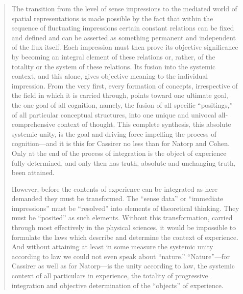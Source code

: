 \documentclass{article}
\begin{document}
\begin{quote}
    The transition from the level of sense impressions to the mediated world of spatial representations is made possible by the fact that within the sequence of fluctuating impressions certain constant relations can be fixed and defined and can be asserted as something permanent and independent of the flux itself.  Each impression must then prove its objective significance by becoming an integral element of these relations or, rather, of the totality or the system of these relations.  Its fusion into the systemic context, and this alone, gives objective meaning to the individual impression.  From the very first, every formation of concepts, irrespective of the field in which it is carried through, points toward one ultimate goal, the one goal of all cognition, namely, the fusion of all specific ``positings,'' of all particular conceptual structures, into one unique and univocal all-comprehensive context of thought.  This complete synthesis, this absolute systemic unity, is the goal and driving force impelling the process of cognition---and it is this for Cassirer no less than for Natorp and Cohen.  Only at the end of the process of integration is the object of experience fully determined, and only then has truth, absolute and unchanging truth, been attained.  

    However, before the contents of experience can be integrated as here demanded they must be transformed.  The ``sense data'' or ``immediate impressions'' must be ``resolved'' into elements of theoretical thinking.  They must be ``posited'' as such elements.  Without this transformation, carried through most effectively in the physical sciences, it would be impossible to formulate the laws which describe and determine the context of experience.  And without attaining at least in some measure the systemic unity according to law we could not even speak about ``nature.''  ``Nature''---for Cassirer as well as for Natorp---is the unity according to law, the systemic context of all particulars in experience, the totality of progressive integration and objective determination of the ``objects'' of experience.  


\end{quote}
\end{document}
